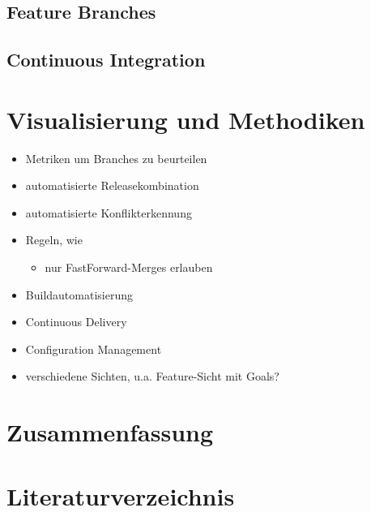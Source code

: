 \documentclass[12pt,a4paper]{book}
\begin{document}
\section{Feature Branches}

\section{Continuous Integration}

\chapter{Visualisierung und Methodiken}

\begin{itemize}
\item Metriken um Branches zu beurteilen
\item automatisierte Releasekombination
\item automatisierte Konflikterkennung
\item Regeln, wie 
	\begin{itemize}
		\item nur FastForward-Merges erlauben
	\end{itemize}	 
\item Buildautomatisierung
\item Continuous Delivery
\item Configuration Management
\item verschiedene Sichten, u.a. Feature-Sicht mit Goals?
\end{itemize}

\chapter{Zusammenfassung}


\chapter{Literaturverzeichnis}

\printbibliography
\end{document}
